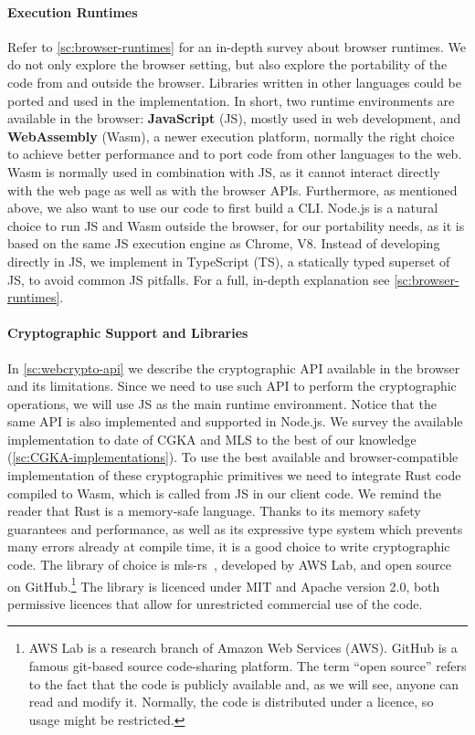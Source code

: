 \paragraph{Execution Runtimes} 
Refer to \cref{sc:browser-runtimes} for an in-depth survey about browser runtimes.
We do not only explore the browser setting, but also explore
the portability of the code from and outside the browser.
Libraries written in other languages could be ported and used in the implementation.
In short, two runtime environments are available in the browser:
\textbf{JavaScript} (JS), mostly used in web development, and \textbf{WebAssembly} (Wasm),
a newer execution platform, normally the right choice to achieve better performance
and to port code from other languages to the web. Wasm is normally
used in combination with JS, as it cannot interact directly with
the web page as well as with the browser APIs. Furthermore, 
as mentioned above, we also want to use our code to first build a CLI.
Node.js is a natural choice to run JS and Wasm outside the browser,
for our portability needs, as it is based on the same 
JS execution engine as Chrome, V8.
Instead of developing directly in JS, we implement in TypeScript (TS),
a statically typed superset of JS, to avoid common JS pitfalls.
For a full, in-depth explanation see \cref{sc:browser-runtimes}.

\paragraph{Cryptographic Support and Libraries}
In \cref{sc:webcrypto-api} we describe the cryptographic API
available in the browser and its limitations. Since we need to use
such API to perform the cryptographic operations, we will use JS
as the main runtime environment.
Notice that the same API is also implemented and supported in Node.js.
We survey the available 
implementation to date of CGKA and MLS
to the best of our knowledge (\cref{sc:CGKA-implementations}).
To use the best available
and browser-compatible implementation of these cryptographic
primitives we need to integrate Rust code compiled to Wasm, which is
called from JS in our client code. We remind the reader that
Rust is a memory-safe language.
Thanks to its memory safety guarantees and performance,
as well as its expressive type system which prevents many errors already at compile time,
it is a good choice to write cryptographic code.
The library of choice is mls-rs~\cite{AWSMLSGroup}, developed by AWS Lab, 
and open source on GitHub.\footnote{AWS Lab is a research branch of Amazon Web Services (AWS). GitHub is a famous git-based source code-sharing platform. The term ``open source'' refers to the fact that the code is publicly available and, as we will see, anyone can read and modify it. Normally, the code is distributed under a licence, so usage might be restricted.}
The library is licenced under MIT and Apache version 2.0, both
permissive licences that allow for unrestricted commercial use of the code.

